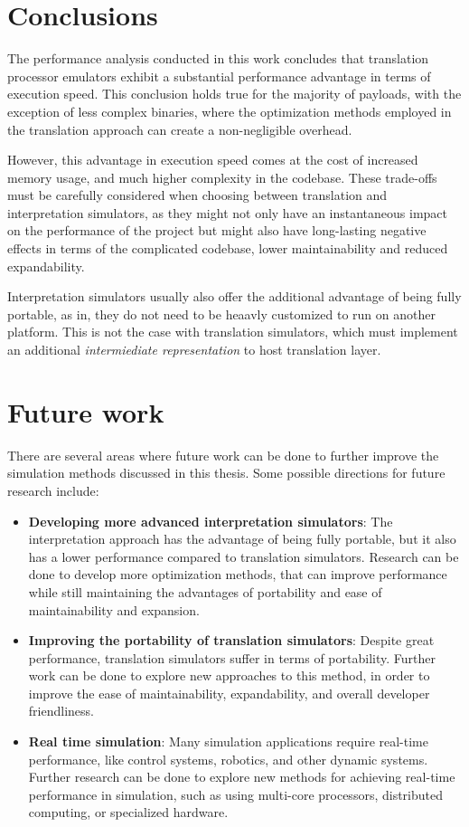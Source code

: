 \pagebreak

\section{Conclusions}

The performance analysis conducted in this work concludes that translation processor emulators exhibit a substantial
performance advantage in terms of execution speed. This conclusion holds true for the majority of payloads, with the
exception of less complex binaries, where the optimization methods employed in the translation approach can create a
non-negligible overhead.

However, this advantage in execution speed comes at the cost of increased memory usage, and much higher complexity in
the codebase. These trade-offs must be carefully considered when choosing between translation and interpretation
simulators, as they might not only have an instantaneous impact on the performance of the project but might also
have long-lasting negative effects in terms of the complicated codebase, lower maintainability and reduced
expandability.

Interpretation simulators usually also offer the additional advantage of being fully portable, as in, they do not need
to be heaavly customized to run on another platform. This is not the case with translation simulators, which must
implement an additional \textit{intermiediate representation} to host translation layer.

\section{Future work}

There are several areas where future work can be done to further improve the simulation methods discussed in this
thesis. Some possible directions for future research include:

\begin{itemize}
    \item{\textbf{Developing more advanced interpretation simulators}: The interpretation approach has the advantage of
     being fully portable, but it also has a lower performance compared to translation simulators. Research can be done
     to develop more optimization methods, that can improve performance while still maintaining the advantages of
     portability and ease of maintainability and expansion.}
     \item{\textbf{Improving the portability of translation simulators}: Despite great performance, translation
     simulators suffer in terms of portability. Further work can be done to explore new approaches to this method, in
     order to improve the ease of maintainability, expandability, and overall developer friendliness.}
     \item{\textbf{Real time simulation}: Many simulation applications require real-time performance, like control
     systems, robotics, and other dynamic systems. Further research can be done to explore new methods for achieving
     real-time performance in simulation, such as using multi-core processors, distributed computing, or specialized
     hardware.}
\end{itemize}